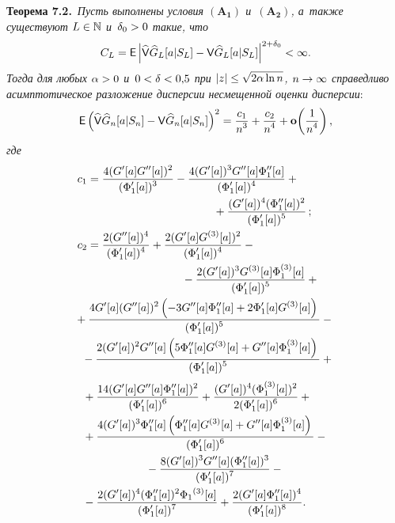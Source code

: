 \begin{multicols}{2}
 \noindent
 \textbf{Теорема 7.2.}\
\textit{Пусть выполнены условия $\mathbf{(A_1)}$ и~$\mathbf{(A_2)}$, а~также
 существуют $L\hm\in\Np$ и~$\delta_0\hm>0$ такие, что}
 $$
 C_L={\sf E} \left|\widehat{{\sf V}}\widehat{G}_L[a|S_L]-
 {\sf V}\widehat{G}_L[a|S_L] \right|^{2+\delta_0}<\infty.
 $$
 \textit{Тогда для любых $\alpha\hm>0$ и~$0\hm<\delta\hm<0{,}5$ при $|z|\hm\le \sqrt{2\alpha\ln n}$, $n\hm\rightarrow\infty$ 
 справедливо асимптотическое разложение дисперсии несмещенной оценки дисперсии}:
 \begin{equation*}
 {\sf E}\left(\widehat{{\sf V}}\widehat{G}_n[a|S_n]-
 {\sf V}\widehat{G}_n[a|S_n]\right)^2
 =\displaystyle\frac{\displaystyle c_{1}\mathstrut}{\displaystyle n^3\mathstrut}+\displaystyle\frac{\displaystyle c_{2}\mathstrut}{\displaystyle n^4\mathstrut}+
 \mathbf{o}\!\left(\displaystyle\frac{\displaystyle 1\mathstrut}{\displaystyle n^{4 }\mathstrut}\right),
 \end{equation*}
\textit{где}
  \begin{align*}
  c_{1}&=
 \fr{4 (G'[a] G''[a])^2}{(\Phi_1'[a])^3}-
 \fr{4 (G'[a])^3 G''[a] \Phi_1''[a]}{(\Phi_1'[a])^4}+{}\\
 &\hspace*{40mm}{}+
 \fr{(G'[a])^4 (\Phi_1''[a])^2}{(\Phi_1'[a])^5}\,;
\\
 c_{2}&=
 \fr{2 (G''[a])^4}{(\Phi_1'[a])^4}
 + \fr{2 (G'[a] G^{(3)}[a])^2}{(\Phi_1'[a])^4}
 - {}\\
 &\hspace*{30mm}{}-\fr{2 (G'[a])^3 G^{(3)}[a] \Phi_1^{(3)}[a]}{(\Phi_1'[a])^5}+{}\\
&\hspace*{-11.32532pt}{} +\fr{4 G'[a] (G''[a])^2 \left(-3 G''[a] \Phi_1''[a]+
 2 \Phi_1'[a] G^{(3)}[a]\right)}{(\Phi_1'[a])^5}-{}
\\
&\hspace*{-4.79753pt}{} -\fr{2 (G'[a])^2 G''[a] \left(5 \Phi_1''[a] G^{(3)}[a]+G''[a]
 \Phi_1^{(3)}[a]\right)}{(\Phi_1'[a])^5} +{}
 \end{align*}
  \begin{align*}
 &{}+\fr{14 (G'[a] G''[a] \Phi_1''[a])^2}{(\Phi_1'[a])^6}
 + \fr{(G'[a])^4 (\Phi_1^{(3)}[a])^2}{2 (\Phi_1'[a])^6}+{}
\\
&{} +\fr{4 (G'[a])^3 \Phi_1''[a] \left(\Phi_1''[a] G^{(3)}[a]+
  G''[a] \Phi_1^{(3)}[a]\right)}{(\Phi_1'[a])^6}-{}
\\
& \hspace*{20mm}{}- \fr{8 (G'[a])^3 G''[a] (\Phi_1''[a])^3}{(\Phi_1'[a])^7}
 -{}\\
 &{}-\fr{2 (G'[a])^4 (\Phi_1''[a])^2 \Phi_1{}^{(3)}[a]}{(\Phi_1'[a])^7}
 +\fr{2 (G'[a] \Phi_1''[a])^4}{(\Phi_1'[a])^8}.
 \end{align*}




\end{multicols}
